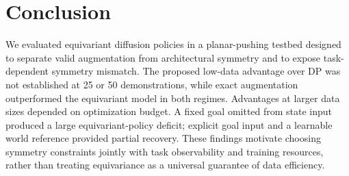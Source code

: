 \section{Conclusion}
We evaluated equivariant diffusion policies in a planar-pushing testbed
designed to separate valid augmentation from architectural symmetry and
to expose task-dependent symmetry mismatch. The proposed low-data advantage
over DP was not established at 25 or 50 demonstrations, while exact
augmentation outperformed the equivariant model in both regimes. Advantages
at larger data sizes depended on optimization budget. A fixed goal omitted
from state input produced a large equivariant-policy deficit; explicit goal
input and a learnable world reference provided partial recovery. These
findings motivate choosing symmetry constraints jointly with task
observability and training resources, rather than treating equivariance
as a universal guarantee of data efficiency.
